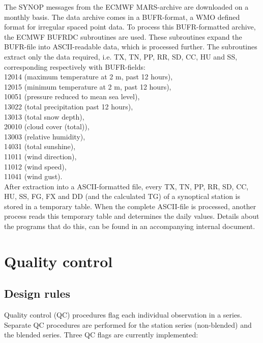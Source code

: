 \documentclass[a4paper,11pt]{article}
\begin{document}
The SYNOP messages from the ECMWF MARS-archive are downloaded on a
monthly basis. The data archive comes in a BUFR-format, a WMO defined
format for irregular spaced point data. To process this BUFR-formatted
archive, the ECMWF BUFRDC subroutines are used. These subroutines
expand the BUFR-file into ASCII-readable data, which is processed
further. The subroutines extract only the data required, i.e. TX, TN,
PP, RR, SD, CC, HU and SS, corresponding respectively with BUFR-fields:\\
12014 (maximum temperature at 2 m, past 12 hours),\\
12015 (minimum temperature at 2 m, past 12 hours),\\ 
10051 (pressure reduced to mean sea level),\\
13022 (total precipitation past 12 hours),\\
13013 (total snow depth),\\
20010 (cloud cover (total)),\\
13003 (relative humidity),\\
14031 (total sunshine),\\
11011 (wind direction),\\
11012 (wind speed),\\
11041 (wind gust).\\

After extraction into a ASCII-formatted file, every TX, TN, PP, RR,
SD, CC, HU, SS, FG, FX and DD (and the calculated TG) of a synoptical
station is stored in a temporary table. When the complete ASCII-file
is processed, another process reads this temporary table and
determines the daily values. Details about the programs that do this,
can be found in an accompanying internal document.





\section{Quality control}
\label{sec:qc}

\subsection{Design rules}
\label{sec:qcrules}

Quality control (QC) procedures flag each individual observation in a
series. Separate QC procedures are performed for the station series
(non-blended) and the blended series.  Three QC flags are currently
implemented:
\end{document}
